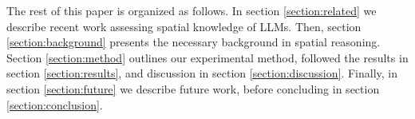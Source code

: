 The rest of this paper is organized as follows.
In section \ref{section:related} we describe recent work assessing spatial knowledge of LLMs.
Then, section \ref{section:background} presents the necessary background in spatial reasoning.
Section \ref{section:method} outlines our experimental method, followed the results in section \ref{section:results}, and discussion in section \ref{section:discussion}.
Finally, in section \ref{section:future} we describe future work, before concluding in section \ref{section:conclusion}. 




%
%
%




